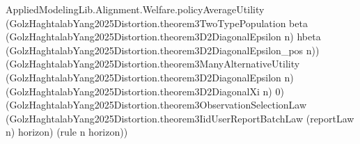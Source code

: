 \documentclass[10pt]{article}
\begin{document}
\begin{ReviewVerbatim}
                                AppliedModelingLib.Alignment.Welfare.policyAverageUtility
                                  (GolzHaghtalabYang2025Distortion.theorem3TwoTypePopulation beta
                                    (GolzHaghtalabYang2025Distortion.theorem3D2DiagonalEpsilon n) hbeta
                                    (GolzHaghtalabYang2025Distortion.theorem3D2DiagonalEpsilon_pos n))
                                  (GolzHaghtalabYang2025Distortion.theorem3ManyAlternativeUtility
                                    (GolzHaghtalabYang2025Distortion.theorem3D2DiagonalEpsilon n)
                                    (GolzHaghtalabYang2025Distortion.theorem3D2DiagonalXi n) 0)
                                  (GolzHaghtalabYang2025Distortion.theorem3ObservationSelectionLaw
                                    (GolzHaghtalabYang2025Distortion.theorem3IidUserReportBatchLaw (reportLaw n)
                                      horizon)
                                    (rule n horizon))
\end{ReviewVerbatim}
\end{document}
